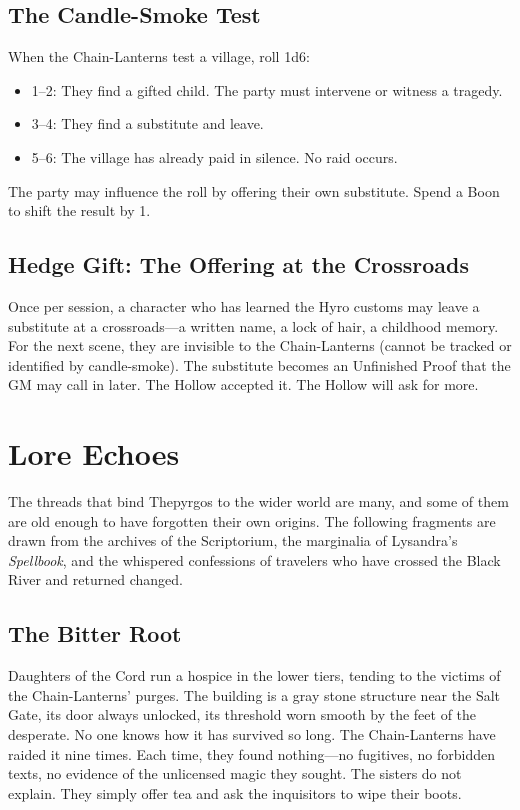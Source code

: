 \documentclass[10pt,twocolumn]{book}
\begin{document}
\section{The Candle-Smoke Test}

When the Chain-Lanterns test a village, roll 1d6:
\begin{itemize}[noitemsep]
\item 1--2: They find a gifted child. The party must intervene or witness a tragedy.
\item 3--4: They find a substitute and leave.
\item 5--6: The village has already paid in silence. No raid occurs.
\end{itemize}

The party may influence the roll by offering their own substitute. Spend a Boon to shift the result by 1.

\section{Hedge Gift: The Offering at the Crossroads}

Once per session, a character who has learned the Hyro customs may leave a substitute at a crossroads---a written name, a lock of hair, a childhood memory. For the next scene, they are invisible to the Chain-Lanterns (cannot be tracked or identified by candle-smoke). The substitute becomes an Unfinished Proof that the GM may call in later. The Hollow accepted it. The Hollow will ask for more.


\chapter{Lore Echoes}

The threads that bind Thepyrgos to the wider world are many, and some of them are old enough to have forgotten their own origins. The following fragments are drawn from the archives of the Scriptorium, the marginalia of Lysandra's \textit{Spellbook}, and the whispered confessions of travelers who have crossed the Black River and returned changed.

\section{The Bitter Root}

Daughters of the Cord run a hospice in the lower tiers, tending to the victims of the Chain-Lanterns' purges. The building is a gray stone structure near the Salt Gate, its door always unlocked, its threshold worn smooth by the feet of the desperate. No one knows how it has survived so long. The Chain-Lanterns have raided it nine times. Each time, they found nothing---no fugitives, no forbidden texts, no evidence of the unlicensed magic they sought. The sisters do not explain. They simply offer tea and ask the inquisitors to wipe their boots.
\end{document}
